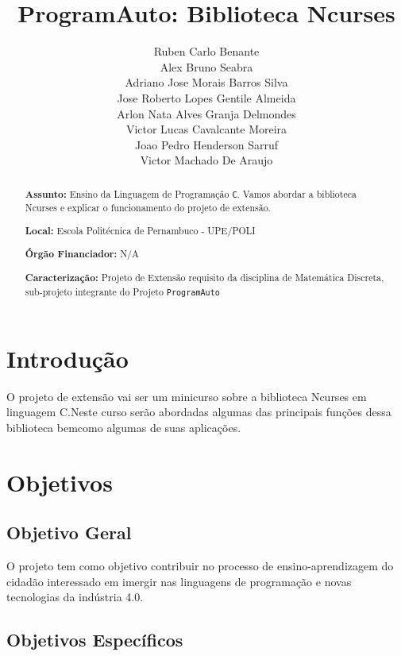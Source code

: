 \documentclass[a4paper,10pt]{article} %
\title{ProgramAuto: Biblioteca Ncurses}
\author{Ruben Carlo Benante \\ Alex Bruno Seabra \\ Adriano Jose Morais Barros Silva \\ Jose Roberto Lopes Gentile Almeida \\ Arlon Nata Alves Granja Delmondes \\ Victor Lucas Cavalcante Moreira \\ Joao Pedro Henderson Sarruf \\ Victor Machado De Araujo}
\begin{document}
\maketitle

\begin{abstract}

\textbf{Assunto:} Ensino da Linguagem de Programação \texttt{C}.
Vamos abordar a biblioteca Ncurses e explicar o funcionamento do projeto de extensão.



\textbf{Local:} Escola Politécnica de Pernambuco - UPE/POLI

\textbf{Órgão Financiador:} N/A

\textbf{Caracterização:} Projeto de Extensão requisito da disciplina de Matemática Discreta, sub-projeto integrante do Projeto \texttt{ProgramAuto}


\end{abstract}


\section{Introdução}

O projeto de extensão vai ser um minicurso sobre a biblioteca Ncurses em linguagem C.Neste curso serão abordadas algumas das principais funções dessa biblioteca bemcomo algumas de suas aplicações.


\section{Objetivos}

\subsection{Objetivo Geral}

O projeto tem como objetivo contribuir no processo de ensino-aprendizagem do cidadão interessado em imergir nas linguagens de programação e novas tecnologias da indústria 4.0.


\subsection{Objetivos Específicos}
\end{document}
